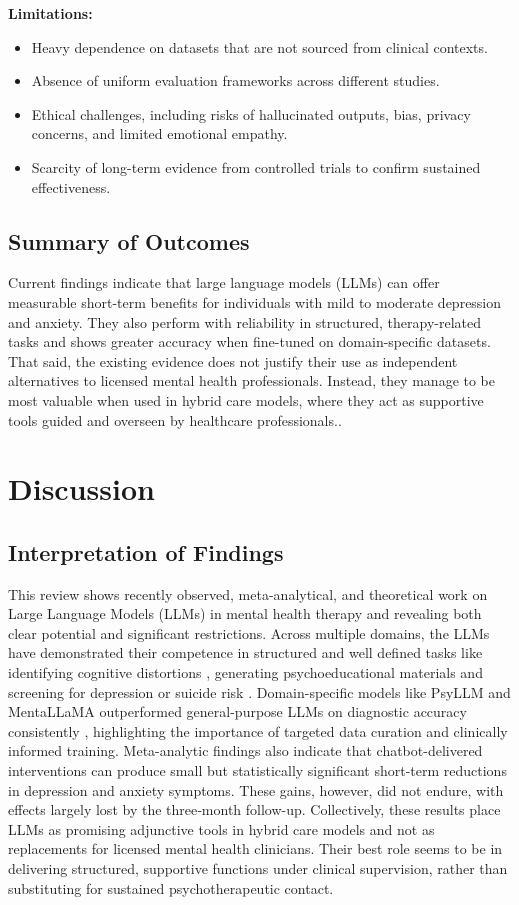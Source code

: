 \documentclass[sn-basic,authoryear]{sn-jnl}
\begin{document}
\textbf{Limitations:}
\begin{itemize}
    \item Heavy dependence on datasets that are not sourced from clinical contexts. 
    \item Absence of uniform evaluation frameworks across different studies.
    \item Ethical challenges, including risks of hallucinated outputs, bias, privacy concerns, and limited emotional empathy. 
    \item Scarcity of long-term evidence from controlled trials to confirm sustained effectiveness.
\end{itemize}

\subsection{Summary of Outcomes}
Current findings indicate that large language models (LLMs) can offer measurable short-term benefits for individuals with mild to moderate depression and anxiety. They also perform with reliability in structured, therapy-related tasks and shows greater accuracy when fine-tuned on domain-specific datasets. That said, the existing evidence does not justify their use as independent alternatives to licensed mental health professionals. Instead, they manage to be most valuable when used in hybrid care models, where they act as supportive tools guided and overseen by healthcare professionals..

\section{Discussion}

\subsection{Interpretation of Findings}
This review shows recently observed, meta-analytical, and theoretical work on Large Language Models (LLMs) in mental health therapy and revealing both clear potential and significant restrictions. Across multiple domains, the LLMs have demonstrated their competence in structured and well defined tasks like identifying cognitive distortions \citep{Hodson2024}, generating psychoeducational materials \citep{Goebel, Khandelwal} and screening for depression or suicide risk \citep{Yang2024}. Domain-specific models like PsyLLM and MentaLLaMA outperformed general-purpose LLMs on diagnostic accuracy consistently \citep{Hu2025, Yang2024} , highlighting the importance of targeted data curation and clinically informed training. Meta-analytic findings \citep{Zhong2024} also indicate that chatbot-delivered interventions can produce small but statistically significant short-term reductions in depression and anxiety symptoms. These gains, however, did not endure, with effects largely lost by the three‑month follow-up. Collectively, these results place LLMs as promising adjunctive tools in hybrid care models and not as replacements for licensed mental health clinicians. Their best role seems to be in delivering structured, supportive functions under clinical supervision, rather than substituting for sustained psychotherapeutic contact.
\end{document}
